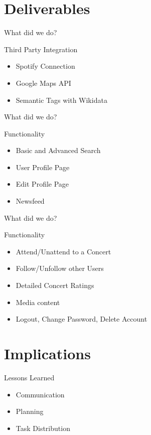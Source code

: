 \documentclass{beamer}
\begin{document}
\section{Deliverables}

\begin{frame}{What did we do?}
	\begin{block}{Third Party Integration}
		\begin{itemize}
			\item[\Checkmark] Spotify Connection
			\item[\Checkmark] Google Maps API
			\item[\Checkmark] Semantic Tags with Wikidata		
		\end{itemize}
	\end{block}
\end{frame}

\begin{frame}{What did we do?}	
	\begin{block}{Functionality}
		\begin{itemize}
			\item[\Checkmark] 	Basic and Advanced Search
			\item[\Checkmark] 	User Profile Page
			\item[\XSolidBrush] Edit Profile Page
			\item[\Checkmark] 	Newsfeed
		\end{itemize}
	\end{block}
\end{frame}

\begin{frame}{What did we do?}	
	\begin{block}{Functionality}
		\begin{itemize}
			\item[\Checkmark] Attend/Unattend to a Concert
			\item[\Checkmark] Follow/Unfollow other Users
			\item[\Checkmark] Detailed Concert Ratings
			\item[\Checkmark] Media content
			\item[\Checkmark] Logout, Change Password, Delete Account
		\end{itemize}
	\end{block}
\end{frame}

\section{Implications}
\begin{frame}
  {Lessons Learned}

  \begin{itemize}
  \item Communication
  \item Planning
  \item Task Distribution
    
  \end{itemize}
\end{frame}
\end{document}
